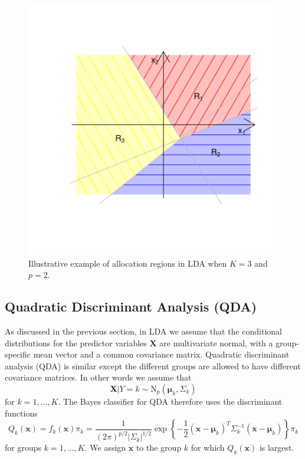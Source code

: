 \documentclass[
]{article}
\begin{document}
\begin{figure}[th]

{\centering \includegraphics{LDAillustration-1} 

}

\caption{Illustrative example of allocation regions in LDA when $K=3$ and $p=2$.}\label{fig:LDAillustration}
\end{figure}

\hypertarget{quadratic-discriminant-analysis-qda}{%
\subsection{Quadratic Discriminant Analysis
(QDA)}\label{quadratic-discriminant-analysis-qda}}

As discussed in the previous section, in LDA we assume that the
conditional distributions for the predictor variables \(\boldsymbol{X}\)
are multivariate normal, with a group-specific mean vector and a common
covariance matrix. Quadratic discriminant analysis (QDA) is similar
except the different groups are allowed to have different covariance
matrices. In other words we assume that \begin{equation*}
\boldsymbol{X} | Y = k \sim \mathrm{N}_p(\boldsymbol{\mu}_k, \Sigma_k)
\end{equation*} for \(k=1,\ldots,K\). The Bayes classifier for QDA
therefore uses the discriminant functions \begin{equation*}
Q_k(\boldsymbol{x}) = f_k(\boldsymbol{x}) \pi_k = \frac{1}{(2\pi)^{p/2} |\Sigma_k|^{1/2}} \exp\left\{-\frac{1}{2}\left(\boldsymbol{x} - \boldsymbol{\mu}_k\right)^T \Sigma_k^{-1} \left(\boldsymbol{x} - \boldsymbol{\mu}_k \right)\right\} \pi_k
\end{equation*} for groups \(k=1,\dots,K\). We assign \(\boldsymbol{x}\)
to the group \(k\) for which \(Q_k(\boldsymbol{x})\) is largest.
\end{document}
